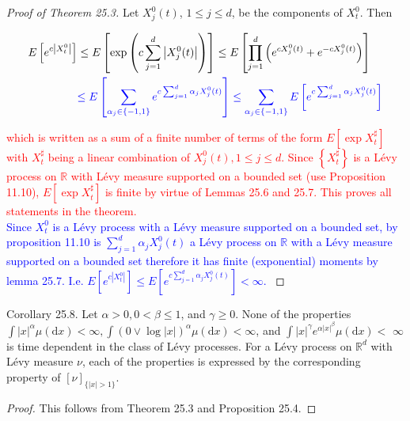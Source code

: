 \documentclass[a4paper,11pt]{article}
\begin{document}
\begin{proof}[Proof of Theorem 25.3]
    Let $X_{j}^{0}(t)$, $1 \leq j \leq d$, be the components of $X_{t}^{0}$. Then

    \begin{align*}
        E\left[e^{c\left|X_{t}^{0}\right|}\right] & \leq E\left[\exp \left(c \sum_{j=1}^{d}\left|X_{j}^{0}(t)\right|\right)\right] \leq E\left[\prod_{j=1}^{d}\left(e^{c X_{j}^{0}(t)}+e^{-c X_{j}^{0}(t)}\right)\right] \\
                                                  & \textcolor{blue}{
            \le  E \left[ \sum_{\alpha_{j} \in \{-1,1\}} e^{c \sum_{ j=1} ^{d} \alpha_{j} X^{0}_{j}(t)} \right]
            \le  \sum_{\alpha_{j} \in \{-1,1\}} E \left[e^{c \sum_{ j=1} ^{d} \alpha_{j} X^{0}_{j}(t)} \right]
        }
    \end{align*}

    \textcolor{red}{
        which is written as a sum of a finite number of terms of the form $E\left[\exp X_{t}^{\sharp}\right]$
        with $X_{t}^{\sharp}$ being a linear combination of $X_{j}^{0}(t), 1 \leq j \leq d$. Since $\left\{X_{t}^{\sharp}\right\}$
        is a Lévy process on $\mathbb{R}$ with Lévy measure supported on a bounded set (use Proposition 11.10),
        $E\left[\exp X_{t}^{\sharp}\right]$ is finite by virtue of Lemmas 25.6 and 25.7. This proves all statements in the theorem.\\
    }
    \textcolor{blue}{
    Since $X^{0}_{t}$ is a Lévy process with a Lévy measure supported on a bounded set,
    by proposition 11.10 is $\sum_{j=1}^{d} \alpha_{j} X^{0}_{j}(t)$ a Lévy process on $\mathbb{R}$ with a Lévy measure supported on a bounded set
    therefore it has finite (exponential) moments by lemma 25.7. I.e. $E\left[e^{c\left|X_{t}^{0}\right|}\right] \le  E \left[e^{c \sum_{ j=1} ^{d} \alpha_{j} X^{0}_{j}(t)} \right] <  \infty$.
    }
\end{proof}

Corollary 25.8. Let $\alpha>0,0<\beta \leq 1$, and $\gamma \geq 0$. None of the properties
$\int|x|^{\alpha} \mu(\mathrm{d} x)<\infty, \int(0 \vee \log |x|)^{\alpha} \mu(\mathrm{d} x)<\infty$, and
$\int|x|^{\gamma} e^{\alpha|x|^{\beta}} \mu(\mathrm{d} x)<$ $\infty$ is time dependent in the class
of Lévy processes. For a Lévy process on $\mathbb{R}^{d}$ with Lévy measure $\nu$, each of the properties
is expressed by the corresponding property of $[\nu]_{\{|x|>1\}}$.

\begin{proof}
    This follows from Theorem 25.3 and Proposition 25.4.
\end{proof}
\end{document}
